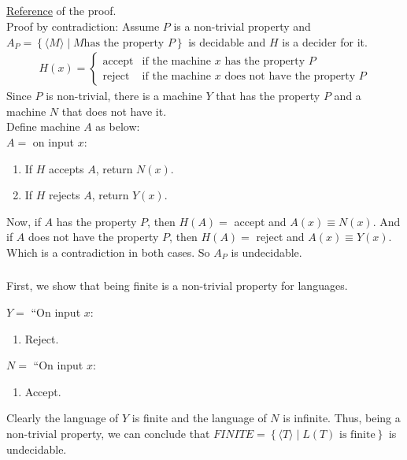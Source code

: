 \documentclass{article}
\begin{document}
\subsection{}
\subsubsection{}
\href{https://www.dcc.fc.up.pt/~acm/ricep.pdf}{Reference} of the proof.\\
Proof by contradiction: Assume \(P\) is a non-trivial property and \(A_P = \left\{\langle M\rangle \mid M \text{has the property } P\right\}\) is decidable and \(H\) is a decider for it.
\begin{align*}
H(x) = \begin{cases}
\text{accept} & \text{if the machine } x \text{ has the property } P\\
\text{reject} & \text{if the machine } x \text{ does not have the property } P
\end{cases}
\end{align*}
Since \(P\) is non-trivial, there is a machine \(Y\) that has the property \(P\) and a machine \(N\) that does not have it.\\
Define machine \(A\) as below:\\[7pt]
\(A = \) on input \(x\):
\begin{enumerate}
\item If \(H\) accepts \(A\), return \(N(x)\).
\item If \(H\) rejects \(A\), return \(Y(x)\).
\end{enumerate}
Now, if \(A\) has the property \(P\), then \(H(A) =\) accept and \(A(x) \equiv N(x)\).
And if \(A\) does not have the property \(P\), then \(H(A) =\) reject and \(A(x) \equiv Y(x)\).
Which is a contradiction in both cases. So \(A_P\) is undecidable.
\subsubsection{}
First, we show that being finite is a non-trivial property for languages.\\
\begin{multicols}{2}
\(Y = \) ``On input \(x\):
\begin{enumerate}
\item Reject.
\end{enumerate}
\(N = \) ``On input \(x\):
\begin{enumerate}
\item Accept.
\end{enumerate}
\end{multicols}
Clearly the language of \(Y\) is finite and the language of \(N\) is infinite.
Thus, being a non-trivial property, we can conclude that \(FINITE = \left\{\langle T\rangle \mid L(T) \text{ is finite}\right\}\) is undecidable.
\end{document}
